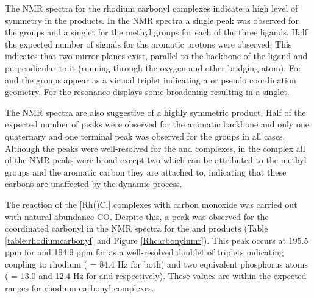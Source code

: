 
The NMR spectra for the rhodium carbonyl complexes indicate a high level of symmetry in the products.  In the \proton{} NMR spectra a single peak was observed for the \tBu{} groups and a singlet for the methyl groups for each of the three ligands.  Half the expected number of signals for the aromatic protons were observed.  This indicates that two mirror planes exist, parallel to the backbone of the ligand and perpendicular to it (running through the oxygen and other bridging atom).  For \tBusixantphos{} and \tBuxantphos{} the \tBu{} groups appear as a virtual triplet indicating a \trans{} or pseudo \trans{} coordination geometry.  For \tButhixantphos{} the \tBu{} resonance displays some broadening resulting in a singlet.

The \carbon{} NMR spectra are also suggestive of a highly symmetric product.  Half of the expected number of peaks were observed for the aromatic backbone and only one quaternary and one terminal peak was observed for the \tBu{} groups in all cases.  Although the peaks were well-resolved for the \tBusixantphos{} and \tBuxantphos{} complexes, in the \tButhixantphos{} complex all of the \carbon{} NMR peaks were broad except two which can be attributed to the methyl groups and the aromatic carbon they are attached to, indicating that these carbons are unaffected by the dynamic process.  

The reaction of the [Rh(\tBuxantphos)Cl] complexes with carbon monoxide was carried out with natural abundance CO.  Despite this, a peak was observed for the coordinated carbonyl in the \carbon{} NMR spectra for the \tBusixantphos{} and \tBuxantphos{} products (Table \ref{table:rhodiumcarbonyl} and Figure \ref{Rhcarbonylnmr}).  This peak occurs at 195.5 ppm for \tBusixantphos{} and 194.9 ppm for \tBuxantphos{} as a well-resolved doublet of triplets indicating coupling to rhodium (\JRhC{} = 84.4 Hz for both) and two equivalent phosphorus atoms (\JPC{} = 13.0 and 12.4 Hz for \tBusixantphos{} and \tBuxantphos{} respectively).  These values are within the expected ranges for rhodium carbonyl complexes.  


